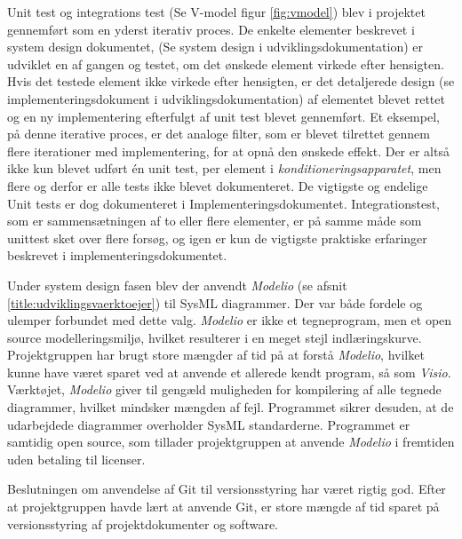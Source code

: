 Unit test og integrations test (Se V-model figur \ref{fig:vmodel}) blev i projektet gennemført som en yderst iterativ proces. De enkelte elementer beskrevet i system design dokumentet, (Se system design i udviklingsdokumentation) er udviklet en af gangen og testet, om det ønskede element virkede efter hensigten. Hvis det testede element ikke virkede efter hensigten, er det detaljerede design (se implementeringsdokument i udviklingsdokumentation) af elementet blevet rettet og en ny implementering efterfulgt af unit test blevet gennemført. Et eksempel, på denne iterative proces, er det analoge filter, som er blevet tilrettet gennem flere iterationer med implementering, for at opnå den ønskede effekt. Der er altså ikke kun blevet udført én unit test, per element i \textit{konditioneringsapparatet}, men flere og derfor er alle tests ikke blevet dokumenteret. De vigtigste og endelige Unit tests er dog dokumenteret i Implementeringsdokumentet. Integrationstest, som er sammensætningen af to eller flere elementer, er på samme måde som unittest sket over flere forsøg, og igen er kun de vigtigste praktiske erfaringer beskrevet i implementeringsdokumentet.

Under system design fasen blev der anvendt \textit{Modelio} (se afsnit \ref{title:udviklingsvaerktoejer}) til SysML diagrammer. Der var både fordele og ulemper forbundet med dette valg. \textit{Modelio} er ikke et tegneprogram, men et open source modelleringsmiljø, hvilket resulterer i en meget stejl indlæringskurve. Projektgruppen har brugt store mængder af tid på at forstå \textit{Modelio}, hvilket kunne have været sparet ved at anvende et allerede kendt program, så som \textit{Visio}. Værktøjet, \textit{Modelio} giver til gengæld muligheden for kompilering af alle tegnede diagrammer, hvilket mindsker mængden af fejl. Programmet sikrer desuden, at de udarbejdede diagrammer overholder SysML standarderne. Programmet er samtidig open source, som tillader projektgruppen at anvende \textit{Modelio} i fremtiden uden betaling til licenser.

Beslutningen om anvendelse af Git til versionsstyring har været rigtig god. Efter at projektgruppen havde lært at anvende Git, er store mængde af tid sparet på versionsstyring af projektdokumenter og software.

